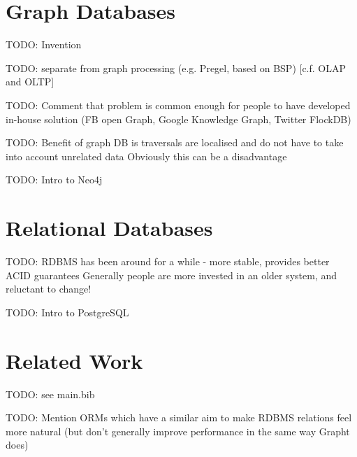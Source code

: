 \section{Graph Databases}

TODO: Invention

TODO: separate from graph processing (e.g. Pregel, based on BSP) [c.f. OLAP and OLTP]

TODO: Comment that problem is common enough for people to have developed in-house solution (FB open Graph, Google Knowledge Graph, Twitter FlockDB)

TODO: Benefit of graph DB is traversals are localised and do not have to take into account unrelated data
		Obviously this can be a disadvantage

TODO: Intro to Neo4j


\section{Relational Databases}

TODO: RDBMS has been around for a while - more stable, provides better ACID guarantees
	Generally people are more invested in an older system, and reluctant to change!

TODO: Intro to PostgreSQL

\section{Related Work}

TODO: see main.bib 

TODO: Mention ORMs which have a similar aim to make RDBMS relations feel more natural (but don't
generally improve performance in the same way Grapht does)


